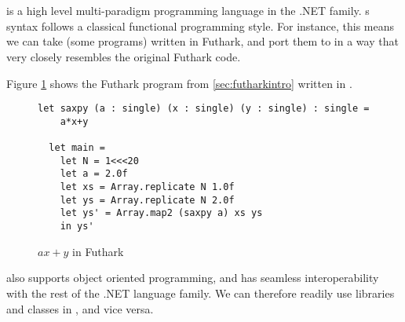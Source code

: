 \section{\fsharp{}}
\fsharp{} is a high level multi-paradigm programming language in the .NET family.
\fsharp{}s syntax follows a classical functional programming style. For
instance, this means we can take (some programs) written in Futhark, and port
them to \fsharp{} in a way that very closely resembles the original Futhark
code.

Figure \ref{fig:fsharpsaxpy} shows the Futhark program from
\ref{sec:futharkintro} written in \fsharp{}.

\begin{figure}[H]
  \centering
\begin{verbatim}
let saxpy (a : single) (x : single) (y : single) : single =
    a*x+y
  
  let main =
    let N = 1<<<20
    let a = 2.0f
    let xs = Array.replicate N 1.0f
    let ys = Array.replicate N 2.0f
    let ys' = Array.map2 (saxpy a) xs ys
    in ys'
  \end{verbatim}
  \caption{$ax+y$ in Futhark}
  \label{fig:fsharpsaxpy}
\end{figure}

\fsharp{} also supports object oriented programming, and has seamless
interoperability with the rest of the .NET language family. We can therefore
readily use \csharp{} libraries and classes in \fsharp{}, and vice versa.

\section*{\csharp{}}
\csharp{} 
\csharp{} 
\csharp{} 
\csharp{} 

